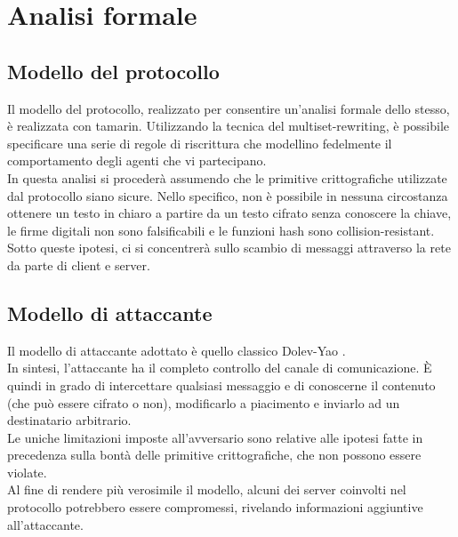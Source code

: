 \section{Analisi formale}

\subsection{Modello del protocollo}
Il modello del protocollo, realizzato per consentire un'analisi formale dello stesso, è realizzata con \gls{tamarin}.
Utilizzando la tecnica del \gls{multiset-rewriting}, è possibile specificare una serie di regole di riscrittura
che modellino fedelmente il comportamento degli agenti che vi partecipano. \\

In questa analisi si procederà assumendo che le primitive crittografiche utilizzate dal protocollo siano sicure.
Nello specifico, non è possibile in nessuna circostanza ottenere un testo in chiaro a partire da un testo cifrato senza conoscere la chiave, 
le firme digitali non sono falsificabili e le funzioni hash sono collision-resistant. \\

Sotto queste ipotesi, ci si concentrerà sullo scambio di messaggi attraverso la rete da parte di client e server.

\subsection{Modello di attaccante}
Il modello di attaccante adottato è quello classico Dolev-Yao \cite{art:dolev-yao}. \\
In sintesi, l'attaccante ha il completo controllo del canale di comunicazione. 
È quindi in grado di intercettare qualsiasi messaggio e di conoscerne il contenuto (che può essere cifrato o non),
modificarlo a piacimento e inviarlo ad un destinatario arbitrario. \\
Le uniche limitazioni imposte all'avversario sono relative alle ipotesi fatte in precedenza 
sulla bontà delle primitive crittografiche, che non possono essere violate. \\

Al fine di rendere più verosimile il modello, alcuni dei server coinvolti nel protocollo potrebbero essere compromessi,
rivelando informazioni aggiuntive all'attaccante.

